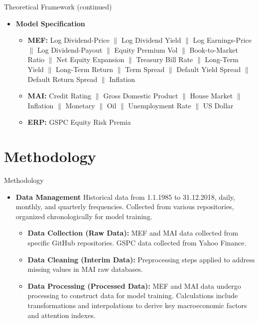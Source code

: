 \documentclass{beamer}
\begin{document}
\begin{frame}{Theoretical Framework (continued)}
  \begin{itemize}
    \item \textbf{Model Specification}
    \newline
      \begin{itemize}
        \item \textbf{MEF:} Log Dividend-Price $\|$ Log Dividend Yield $\|$ Log Earnings-Price $\|$ Log Dividend-Payout $\|$ Equity Premium Vol $\|$ Book-to-Market Ratio $\|$ Net Equity Expansion $\|$ Treasury Bill Rate $\|$ Long-Term Yield $\|$ Long-Term Return $\|$ Term Spread $\|$ Default Yield Spread $\|$ Default Return Spread $\|$ Inflation
        \newline
        \item \textbf{MAI:} Credit Rating $\|$ Gross Domestic Product $\|$ House Market $\|$ Inflation $\|$ Monetary $\|$ Oil $\|$ Unemployment Rate $\|$ US Dollar
        \newline
        \item \textbf{ERP:} GSPC Equity Risk Premia
      \end{itemize}
  \end{itemize}
\end{frame}

\section{Methodology}
\begin{frame}{Methodology}
  \begin{itemize}
    \item \textbf{Data Management}
    Historical data from 1.1.1985 to 31.12.2018, daily, monthly, and quarterly frequencies. Collected from various repositories, organized chronologically for model training.
      \begin{itemize}
        \item \textbf{Data Collection (Raw Data):} MEF and MAI data collected from specific GitHub repositories. GSPC data collected from Yahoo Finance.
        \item \textbf{Data Cleaning (Interim Data):} Preprocessing steps applied to address missing values in MAI raw databases.
        \item \textbf{Data Processing (Processed Data):} MEF and MAI data undergo processing to construct data for model training. Calculations include transformations and interpolations to derive key macroeconomic factors and attention indexes.
      \end{itemize}
  \end{itemize}
\end{frame}
\end{document}
